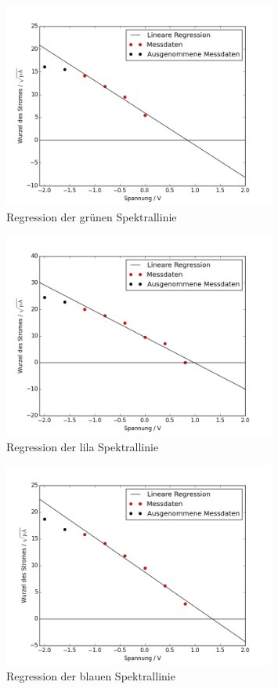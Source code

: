 \begin{figure}[h!]
	\centering
	\includegraphics[width=0.8\textwidth]{build/regression_Farbe:1.png}
	\caption{Regression der grünen Spektrallinie}
	\label{fig:regression_grun}
\end{figure}

\begin{figure}[h!]
	\centering
	\includegraphics[width=0.8\textwidth]{build/regression_Farbe:2.png}
	\caption{Regression der lila Spektrallinie}
	\label{fig:regression_lila}
\end{figure}

\begin{figure}[h!]
	\centering
	\includegraphics[width=0.8\textwidth]{build/regression_Farbe:3.png}
	\caption{Regression der blauen Spektrallinie}
	\label{fig:regression_blau}
\end{figure}

